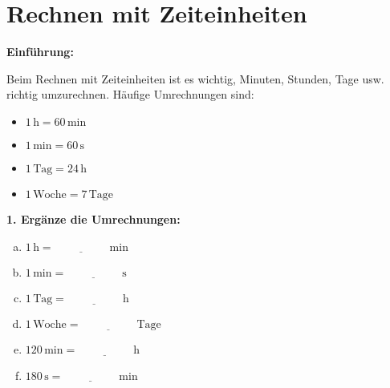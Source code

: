 \section*{Rechnen mit Zeiteinheiten}

\textbf{Einführung:}

Beim Rechnen mit Zeiteinheiten ist es wichtig, Minuten, Stunden, Tage usw. richtig umzurechnen. Häufige Umrechnungen sind:

\begin{itemize}
    \item $1\,\mathrm{h} = 60\,\mathrm{min}$
    \item $1\,\mathrm{min} = 60\,\mathrm{s}$
    \item $1\,\mathrm{Tag} = 24\,\mathrm{h}$
    \item $1\,\mathrm{Woche} = 7\,\mathrm{Tage}$
\end{itemize}

\vspace{0.5em}

\textbf{1. Ergänze die Umrechnungen:}
\begin{multicols}{2}
\begin{enumerate}[a)]
    \item $1\,\mathrm{h} = \underline{\hspace{2cm}}\,\mathrm{min}$
    \item $1\,\mathrm{min} = \underline{\hspace{2cm}}\,\mathrm{s}$
    \item $1\,\mathrm{Tag} = \underline{\hspace{2cm}}\,\mathrm{h}$
    \item $1\,\mathrm{Woche} = \underline{\hspace{2cm}}\,\mathrm{Tage}$
    \item $120\,\mathrm{min} = \underline{\hspace{2cm}}\,\mathrm{h}$
    \item $180\,\mathrm{s} = \underline{\hspace{2cm}}\,\mathrm{min}$
\end{enumerate}
\end{multicols}

\vspace{0.5em}


